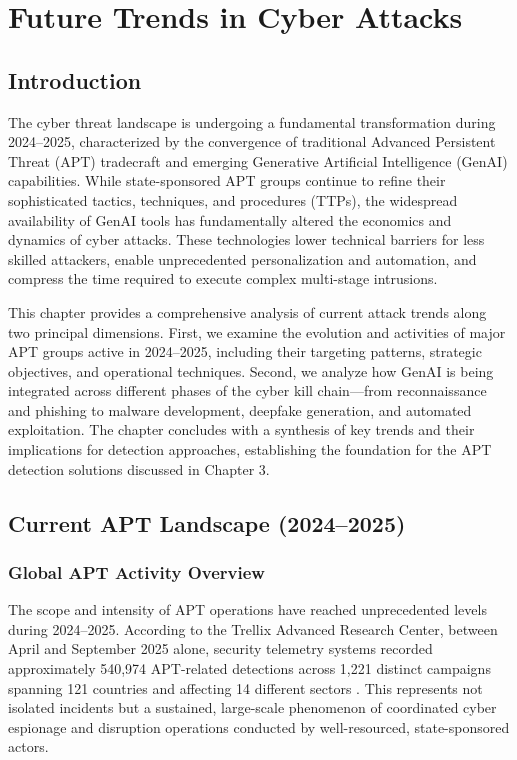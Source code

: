 \chapter{Future Trends in Cyber Attacks}

\section{Introduction}

The cyber threat landscape is undergoing a fundamental transformation during 2024–2025, characterized by the convergence of traditional Advanced Persistent Threat (APT) tradecraft and emerging Generative Artificial Intelligence (GenAI) capabilities. While state-sponsored APT groups continue to refine their sophisticated tactics, techniques, and procedures (TTPs), the widespread availability of GenAI tools has fundamentally altered the economics and dynamics of cyber attacks. These technologies lower technical barriers for less skilled attackers, enable unprecedented personalization and automation, and compress the time required to execute complex multi-stage intrusions.

This chapter provides a comprehensive analysis of current attack trends along two principal dimensions. First, we examine the evolution and activities of major APT groups active in 2024–2025, including their targeting patterns, strategic objectives, and operational techniques. Second, we analyze how GenAI is being integrated across different phases of the cyber kill chain—from reconnaissance and phishing to malware development, deepfake generation, and automated exploitation. The chapter concludes with a synthesis of key trends and their implications for detection approaches, establishing the foundation for the APT detection solutions discussed in Chapter 3.

\section{Current APT Landscape (2024–2025)}

\subsection{Global APT Activity Overview}

The scope and intensity of APT operations have reached unprecedented levels during 2024–2025. According to the Trellix Advanced Research Center, between April and September 2025 alone, security telemetry systems recorded approximately 540,974 APT-related detections across 1,221 distinct campaigns spanning 121 countries and affecting 14 different sectors \cite{trellix2025}. This represents not isolated incidents but a sustained, large-scale phenomenon of coordinated cyber espionage and disruption operations conducted by well-resourced, state-sponsored actors.


